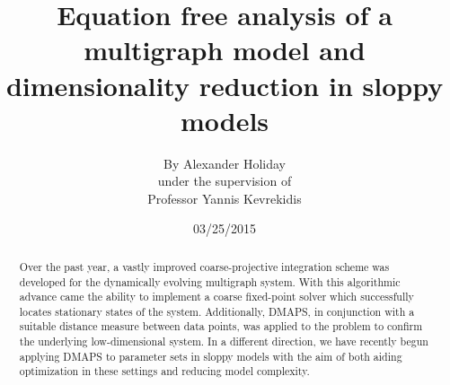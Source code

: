 \documentclass[12pt]{article}
\begin{document}
\title{\vspace{-1cm}Equation free analysis of a multigraph model and dimensionality reduction in sloppy models}
\author{\LARGE By Alexander Holiday\vspace{3mm}\\\Large  under the supervision of\vspace{3mm}\\\LARGE  Professor Yannis Kevrekidis}
\date{03/25/2015}
\maketitle
\begin{spacing}{2.2}
\begin{abstract}
  Over the past year, a vastly improved coarse-projective integration scheme was developed for the dynamically evolving multigraph system. With this algorithmic advance came the ability to implement a coarse fixed-point solver which successfully locates stationary states of the system. Additionally, DMAPS, in conjunction with a suitable distance measure between data points, was applied to the problem to confirm the underlying low-dimensional system. In a different direction, we have recently begun applying DMAPS to parameter sets in sloppy models with the aim of both aiding optimization in these settings and reducing model complexity.
\end{abstract}


\end{spacing}
\end{document}
